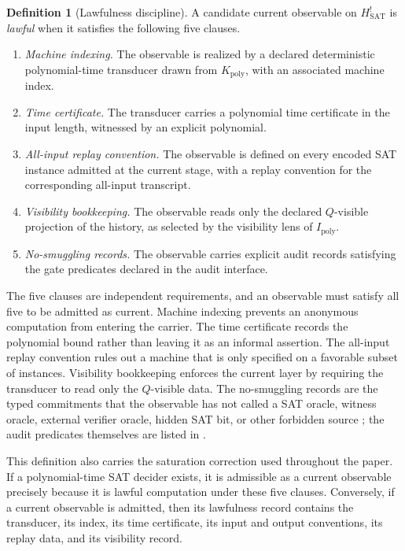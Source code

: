 \documentclass[11pt]{article}
\newcommand{\Hsat}{H^{!}_{\mathrm{SAT}}}
\newcommand{\Ipoly}{I_{\mathrm{poly}}}
\theoremstyle{definition}
\newtheorem{definition}[theorem]{Definition}
\begin{document}
\begin{definition}[Lawfulness discipline]
\label{def:pvnp:lawfulness-discipline}
A candidate current observable on \(\Hsat\) is \emph{lawful} when it
satisfies the following five clauses.
\begin{enumerate}
  \item \emph{Machine indexing.}  The observable is realized by a
  declared deterministic polynomial-time transducer drawn from
  \(K_{\mathrm{poly}}\), with an associated machine index.
  \item \emph{Time certificate.}  The transducer carries a polynomial
  time certificate in the input length, witnessed by an explicit
  polynomial.
  \item \emph{All-input replay convention.}  The observable is defined
  on every encoded SAT instance admitted at the current stage, with a
  replay convention for the corresponding all-input transcript.
  \item \emph{Visibility bookkeeping.}  The observable reads only the
  declared \(Q\)-visible projection of the history, as selected by the
  visibility lens of \(\Ipoly\).
  \item \emph{No-smuggling records.}  The observable carries explicit
  audit records satisfying the gate predicates declared in the audit
  interface.
\end{enumerate}
\end{definition}

The five clauses are independent requirements, and an observable must
satisfy all five to be admitted as current.  Machine indexing prevents
an anonymous computation from entering the carrier.  The time
certificate records the polynomial bound rather than leaving it as an
informal assertion.  The all-input replay convention rules out a
machine that is only specified on a favorable subset of instances.
Visibility bookkeeping enforces the current layer by requiring the
transducer to read only the \(Q\)-visible data.  The no-smuggling
records are the typed commitments that the observable has not called a
SAT oracle, witness oracle, external verifier oracle, hidden SAT bit,
or other forbidden source \citep{AroraBarak2009Complexity}; the audit
predicates themselves are listed in .

This definition also carries the saturation correction used throughout
the paper.  If a polynomial-time SAT decider exists, it is admissible
as a current observable precisely because it is lawful computation
under these five clauses.  Conversely, if a current observable is
admitted,
then its lawfulness record contains the transducer, its index, its
time certificate, its input and output conventions, its replay data,
and its visibility record.
\end{document}
